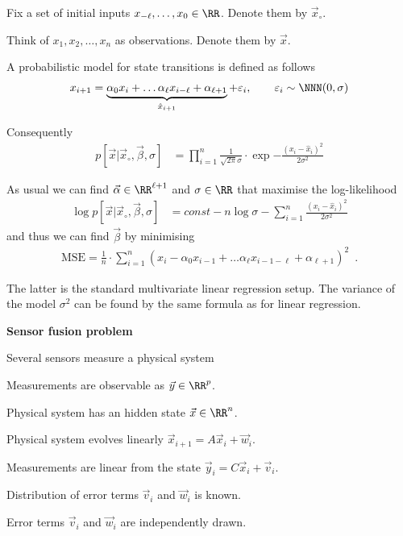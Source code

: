 \documentclass[landscape,footrule]{foils}
\begin{document}
\begin{triangles}
\item Fix a set of initial inputs $x_{-\ell}, \ldots, x_{0}\in \RR$. Denote them by $\vec{x}_\circ$. 
\item Think of $x_{1},x_{2},\ldots, x_n$ as observations. Denote them by $\vec{x}$.  
\item A probabilistic model for state transitions is defined as follows
\begin{align*}
  x_{i+1}=\underbrace{\alpha_0x_i+\ldots \alpha_\ell x_{i-\ell}+\alpha_{\ell+1}}_{\hat{x}_{i+1}}+\varepsilon_i,\qquad \varepsilon_i\sim\NNN(0,\sigma)
\end{align*}
\item Consequently 
\begin{align*}
 p[\vec{x}|\vec{x}_\circ,\vec{\beta},\sigma]&=\prod_{i=1}^n\frac{1}{\sqrt{2\pi}
    \sigma}\cdot\exp{-\frac{(x_i-\hat{x}_i)^2}{2\sigma^2}}
\end{align*}
\end{triangles}



As usual we can find  $\vec{\alpha}\in \RR^{\ell+1}$ and $\sigma\in\RR$ that maximise the log-likelihood
\begin{align*}
\log p[\vec{x}|\vec{x}_\circ,\vec{\beta},\sigma]&= const -n\log \sigma-\sum_{i=1}^n\frac{(x_i-\hat{x}_i)^2}{2\sigma^2}
\end{align*}
and thus we can find $\vec{\beta}$ by minimising 
\begin{align*}
\text{MSE}=\frac{1}{n}\cdot \sum_{i=1}^n(x_i-\alpha_0x_{i-1}+\ldots \alpha_\ell x_{i-1-\ell}+\alpha_{\ell+1})^2\enspace.
\end{align*}

The latter is the standard multivariate linear regression setup. The variance of the model $\sigma^2$ can be found by the same formula as for linear regression.
 
 





\textbf{Sensor fusion problem}

\begin{triangles}
\item Several sensors measure a physical system
\item Measurements are observable as $\vec{y}\in\RR^p$.
\item Physical system has an hidden state $\vec{x}\in\RR^n$.
\item Physical system evolves linearly $\vec{x}_{i+1}=A\vec{x}_i+\vec{w}_i$.
\item Measurements are linear from the state $\vec{y}_{i}=C\vec{x}_i+\vec{v}_i$.
\item Distribution of error terms $\vec{v}_i$ and $\vec{w}_i$ is known.  
\item Error terms $\vec{v}_i$ and $\vec{w}_i$ are independently drawn.
\end{triangles}
\end{document}
